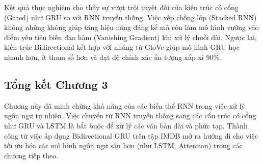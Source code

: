 Kết quả thực nghiệm cho thấy sự vượt trội tuyệt đối của kiến trúc có cổng (Gated) như GRU so với RNN truyền thống. Việc xếp chồng lớp (Stacked RNN) không những không giúp tăng hiệu năng đáng kể mà còn làm mô hình vướng vào điểm yếu tiêu biến đạo hàm (Vanishing Gradient) khi xử lý chuỗi dài. Ngược lại, kiến trúc Bidirectional kết hợp với nhúng từ GloVe giúp mô hình GRU học nhanh hơn, ít tham số hơn và đạt độ chính xác ấn tượng xấp xỉ 90\%.

\subsection{Tổng kết Chương 3}
Chương này đã minh chứng khả năng của các biến thể RNN trong việc xử lý ngôn ngữ tự nhiên. Việc chuyển từ RNN truyền thống sang các cấu trúc có cổng như GRU và LSTM là bắt buộc để xử lý các văn bản dài và phức tạp. Thành công từ việc áp dụng Bidirectional GRU trên tập IMDB mở ra hướng đi cho việc tối ưu hóa các mô hình ngôn ngữ sâu hơn (như LSTM, Attention) trong các chương tiếp theo.
